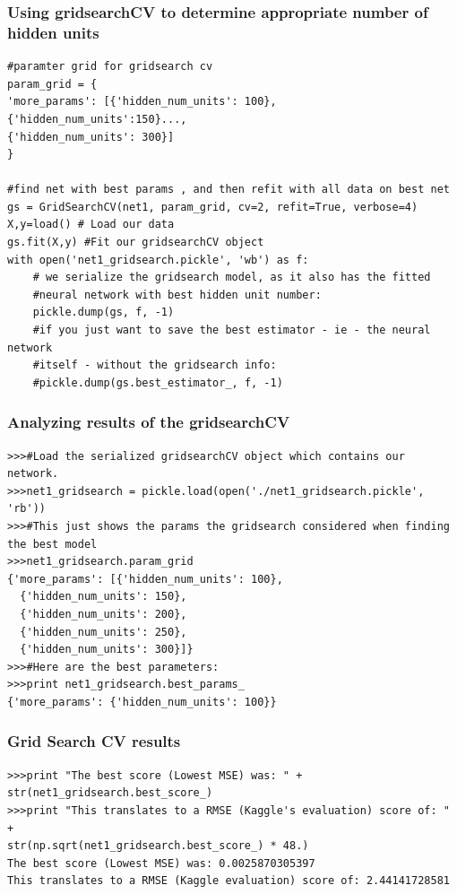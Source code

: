 \documentclass{beamer}
\begin{document}
\begin{frame}[fragile]
\frametitle{Using gridsearchCV to determine appropriate number of hidden units}
\begin{verbatim}
#paramter grid for gridsearch cv
param_grid = {
'more_params': [{'hidden_num_units': 100}, {'hidden_num_units':150}...,
{'hidden_num_units': 300}]
}
 
#find net with best params , and then refit with all data on best net
gs = GridSearchCV(net1, param_grid, cv=2, refit=True, verbose=4)
X,y=load() # Load our data
gs.fit(X,y) #Fit our gridsearchCV object
with open('net1_gridsearch.pickle', 'wb') as f:
    # we serialize the gridsearch model, as it also has the fitted 
    #neural network with best hidden unit number:
    pickle.dump(gs, f, -1)
    #if you just want to save the best estimator - ie - the neural network
    #itself - without the gridsearch info:
    #pickle.dump(gs.best_estimator_, f, -1)
\end{verbatim}
\end{frame}

\begin{frame}[fragile]
\frametitle{Analyzing results of the gridsearchCV}
\begin{verbatim}
>>>#Load the serialized gridsearchCV object which contains our network.
>>>net1_gridsearch = pickle.load(open('./net1_gridsearch.pickle', 'rb'))
>>>#This just shows the params the gridsearch considered when finding the best model
>>>net1_gridsearch.param_grid
{'more_params': [{'hidden_num_units': 100},
  {'hidden_num_units': 150},
  {'hidden_num_units': 200},
  {'hidden_num_units': 250},
  {'hidden_num_units': 300}]}
>>>#Here are the best parameters:
>>>print net1_gridsearch.best_params_
{'more_params': {'hidden_num_units': 100}} 
\end{verbatim}
\end{frame}

\begin{frame}[fragile]
\frametitle{Grid Search CV results}
\begin{verbatim}
>>>print "The best score (Lowest MSE) was: " + str(net1_gridsearch.best_score_)
>>>print "This translates to a RMSE (Kaggle's evaluation) score of: " + 
str(np.sqrt(net1_gridsearch.best_score_) * 48.)
The best score (Lowest MSE) was: 0.0025870305397
This translates to a RMSE (Kaggle evaluation) score of: 2.44141728581
\end{verbatim}
\end{frame}
\end{document}
